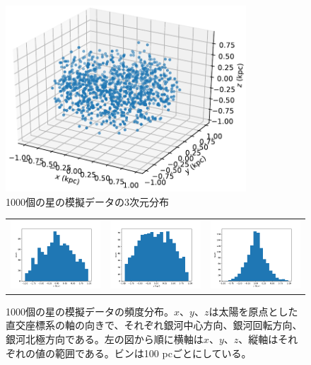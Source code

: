 \begin{figure}[htbp]
\begin{center}
	\includegraphics[width=9cm]{fig/3dMockData.pdf}
	\caption{1000個の星の模擬データの3次元分布}
	\label{dist3dMockData}
\end{center}
\end{figure}

\begin{figure}
   \centering
\begin{tabular}{ccc}
\includegraphics[width=4.5cm]{fig/dist_x.pdf}&
\includegraphics[width=4.5cm]{fig/dist_y.pdf}&
\includegraphics[width=4.5cm]{fig/dist_z.pdf}
\end{tabular}
    \caption{1000個の星の模擬データの頻度分布。$x、y、z$は太陽を原点とした直交座標系の軸の向きで、それぞれ銀河中心方向、銀河回転方向、銀河北極方向である。左の図から順に横軸は$x、y、z$、縦軸はそれぞれの値の範囲である。ビンは100 pcごとにしている。}
    \label{distMockData}
\end{figure}

